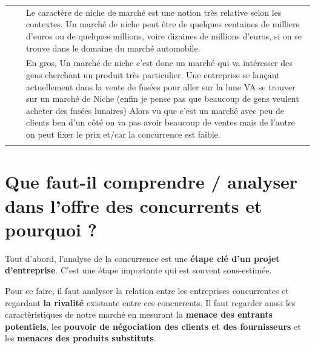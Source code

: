 \documentclass{article}
\begin{document}
\begin{tabular}{|rcl|}
				 &  & \multicolumn{1}{p{.8\textwidth}|}{Le caractère de niche de marché est une notion très relative selon les contextes. Un marché de niche peut être de quelques centaines de milliers d’euros ou de quelques millions, voire dizaines de millions d’euros, si on se trouve dans le domaine du marché automobile.}\\
				 &  & \multicolumn{1}{p{.8\textwidth}|}{En gros, Un marché de niche c'est donc un marché qui va intéresser des gens cherchant un produit très particulier. Une entreprise se lançant actuellement dans la vente de fusées pour aller sur la lune VA se trouver sur un marché de Niche (enfin je pense pas que beaucoup de gens veulent acheter des fusées lunaires) Alors vu que c'est un marché avec peu de clients ben d'un côté on va pas avoir beaucoup de ventes mais de l'autre on peut fixer le prix et/car la concurrence est faible.}\\
&&\\
\hline
\end{tabular}
\section{Que faut-il comprendre / analyser dans l’offre des concurrents et pourquoi ?}
Tout d'abord, l'analyse de la concurrence est une \textbf{étape clé d'un projet d'entreprise}. C'est une étape importante qui est souvent sous-estimée.

Pour ce faire, il faut analyser la relation entre les entreprises concurrentes et regardant \textbf{la rivalité} existante entre ces concurrents. Il faut regarder aussi les caractèristiques de notre marché en mesurant la \textbf{menace des entrants potentiels}, les \textbf{pouvoir de négociation des clients et des fournisseurs} et les \textbf{menaces des produits substituts}.
\end{document}
